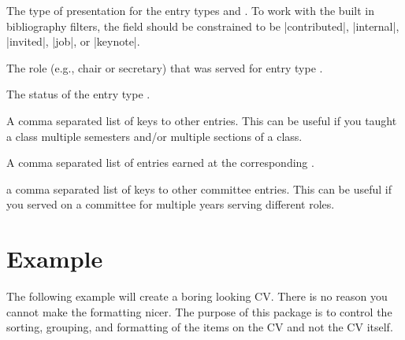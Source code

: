 \documentclass{ltxdockit}[2011/03/25]
\begin{document}
\begin{fieldlist}
	 The type of presentation for the entry types  and . To work with the built in bibliography filters, the field should be constrained to be |contributed|, |internal|, |invited|, |job|, or |keynote|.

	 The role (e.g., chair or secretary) that was served for entry type .

	 The status of the entry type .

	 A comma separated list of keys to other  entries. This can be useful if you taught a class multiple semesters and/or multiple sections of a class.

	 A comma separated list of  entries earned at the corresponding .

	 a comma separated list of keys to other committee entries. This can be useful if you served on a committee for multiple years serving different roles.

\end{fieldlist}

\section{Example}
The following example will create a boring looking CV. There is no reason you cannot make the formatting nicer. The purpose of this package is to control the sorting, grouping, and formatting of the items on the CV and not the CV itself.
\end{document}
